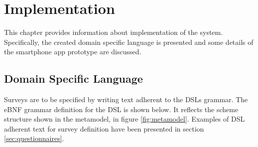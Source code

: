 \chapter{Implementation}
\label{chap:implementation}
This chapter provides information about implementation of the system. Specifically, the created domain specific language is presented and some details of the smartphone app prototype are discussed.

\section{Domain Specific Language}
\label{sec:dsl}
Surveys are to be specified by writing text adherent to the DSLs grammar. The eBNF grammar definition for the DSL is shown below. It reflects the scheme structure shown in the metamodel, in figure \ref{fig:metamodel}. Examples of DSL adherent text for survey definition have been presented in section \ref{sec:questionnaires}.

